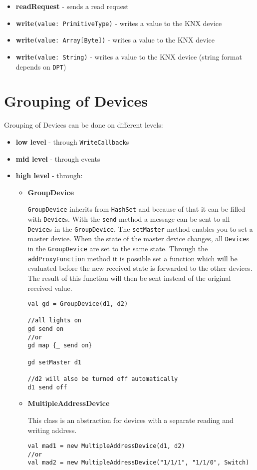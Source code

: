\begin{itemize}
  \item \textbf{readRequest} - sends a read request
  \item \textbf{write}\lstinline!(value: PrimitiveType)! - writes a value to the KNX device
  \item \textbf{write}\lstinline!(value: Array[Byte])! - writes a value to the KNX device
  \item \textbf{write}\lstinline!(value: String)! - writes a value to the KNX device (string format depends on \lstinline!DPT!)
\end{itemize}
\clearpage
\section{Grouping of Devices}

Grouping of Devices can be done on different levels:

\begin{itemize}
  \item \textbf{low level} - through \lstinline!WriteCallback!s
  \item \textbf{mid level} - through events
  \item \textbf{high level} - through:
    \begin{itemize}
        \item \textbf{GroupDevice}
        
        \lstinline!GroupDevice! inherits from \lstinline!HashSet! and because of that it can be filled with \lstinline!Device!s. With the \lstinline!send! method a message can be sent to all \lstinline!Device!s in the \lstinline!GroupDevice!. The \lstinline!setMaster! method enables you to set a master device. When the state of the master device changes, all \lstinline!Device!s in the \lstinline!GroupDevice! are set to the same state. Through the \lstinline!addProxyFunction! method it is possible set a function which will be evaluated before the new received state is forwarded to the other devices. The result of this function will then be sent instead of the original received value.
        

\begin{lstlisting}
val gd = GroupDevice(d1, d2)

//all lights on
gd send on
//or
gd map {_ send on}

gd setMaster d1

//d2 will also be turned off automatically
d1 send off
\end{lstlisting}
        \item \textbf{MultipleAddressDevice}

        This class is an abstraction for devices with a separate reading and writing address.
\begin{lstlisting}
val mad1 = new MultipleAddressDevice(d1, d2)
//or
val mad2 = new MultipleAddressDevice("1/1/1", "1/1/0", Switch)
\end{lstlisting}
    \end{itemize}
\end{itemize}
